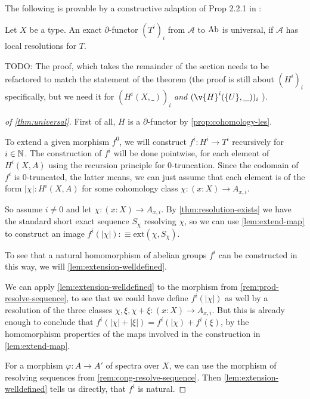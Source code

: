 The following is provable by a constructive adaption of Prop 2.2.1 in \cite{tohoku-translation}:
\begin{theorem}
  \label{thm:universal}
  Let $X$ be a type.
  An exact $\partial$-functor $(T^i)_i$ from $\mathcal A$ to $\operatorname{Ab}$ is universal,
  if $\mathcal A$ has local resolutions for $T$.
\end{theorem}

TODO: The proof, which takes the remainder of the section needs to be refactored to match the statement of the theorem
(the proof is still about $(H^i)_i$ specifically, but we need it for $(H^i(X,\_))_i$ \emph{and} $(\v{H}^i(\{U\},\_))_i$ ).

\begin{proof}[of \cref{thm:universal}]
  First of all, $H$ is a $\partial$-functor by \cref{prop:cohomology-les}.

  To extend a given morphism $f^0$, 
  we will construct $f^i:H^i\to T^i$ recursively for $i\in\mathbb{N}$.
  The construction of $f^i$ will be done pointwise, for each element of $H^i(X,A)$ using the recursion principle for 0-truncation.
  Since the codomain of $f^i$ is 0-truncated, the latter means, we can just assume that each element is of the form $|\chi|:H^i(X,A)$
  for some cohomology class $\chi:(x:X)\to A_{x,i}$.

  So assume $i\neq 0$ and let $\chi:(x:X)\to A_{x,i}$.
  By \cref{thm:resolution-exists} we have the standard short exact sequence $S_\chi$ resolving $\chi$,
  so we can use \cref{lem:extend-map} to construct an image $f^i(|\chi|):\equiv \mathrm{ext}(\chi,S_\chi)$.
  
  To see that a natural homomorphism of abelian groups $f^i$ can be constructed in this way,
  we will \cref{lem:extension-welldefined}.

  We can apply \cref{lem:extension-welldefined} to the morphism from \cref{rem:prod-resolve-sequence},
  to see that we could have define $f^i(|\chi|)$ as well by
  a resolution of the three classes $\chi, \xi, \chi+\xi:(x:X)\to A_{x,i}$.
  But this is already enough to conclude that $f^i(|\chi|+|\xi|)=f^i(|\chi)+f^i(\xi)$, by the homomorphism properties of the maps involved in the construction in \cref{lem:extend-map}.

  For a morphism $\varphi:A\to A'$ of spectra over $X$,
  we can use the morphism of resolving sequences from \cref{rem:cong-resolve-sequence}.
  Then \cref{lem:extension-welldefined} tells us directly, that $f^i$ is natural.
  

\end{proof}
